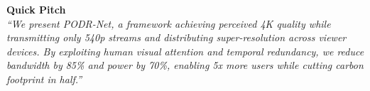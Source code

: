 \documentclass[11pt, a4paper]{article}
\begin{document}
\vfill

\begin{center}
\begin{tcolorbox}[
    enhanced,
    colback=primaryblue!5,
    colframe=primaryblue,
    width=0.9\textwidth,
    arc=5mm,
    boxrule=2pt
]
\centering\Large\sffamily
\textbf{Quick Pitch}\\[0.5em]
\normalsize\itshape
``We present PODR-Net, a framework achieving perceived 4K quality while transmitting only 540p streams and distributing super-resolution across viewer devices. By exploiting human visual attention and temporal redundancy, we reduce bandwidth by 85\% and power by 70\%, enabling 5x more users while cutting carbon footprint in half.''
\end{tcolorbox}
\end{center}
\end{document}
